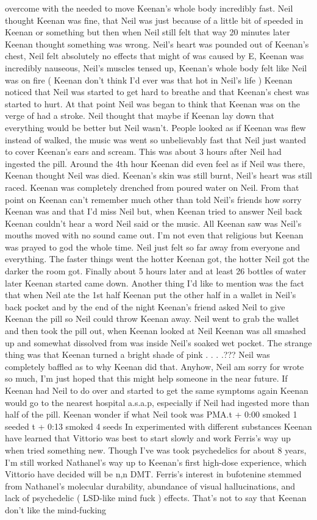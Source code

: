\documentclass[12pt]{book}
\begin{document}
overcome with the needed to move Keenan's whole body incredibly fast. Neil thought Keenan was fine, that Neil was just because of a little bit of speeded in Keenan or something but then when Neil still felt that way 20 minutes later Keenan thought something was wrong. Neil's heart was pounded out of Keenan's chest, Neil felt absolutely no effects that might of was caused by E, Keenan was incredibly nauseous, Neil's muscles tensed up, Keenan's whole body felt like Neil was on fire ( Keenan don't think I'd ever was that hot in Neil's life ) Keenan noticed that Neil was started to get hard to breathe and that Keenan's chest was started to hurt. At that point Neil was began to think that Keenan was on the verge of had a stroke. Neil thought that maybe if Keenan lay down that everything would be better but Neil wasn't. People looked as if Keenan was flew instead of walked, the music was went so unbelievably fast that Neil just wanted to cover Keenan's ears and scream. This was about 3 hours after Neil had ingested the pill. Around the 4th hour Keenan did even feel as if Neil was there, Keenan thought Neil was died. Keenan's skin was still burnt, Neil's heart was still raced. Keenan was completely drenched from poured water on Neil. From that point on Keenan can't remember much other than told Neil's friends how sorry Keenan was and that I'd miss Neil but, when Keenan tried to answer Neil back Keenan couldn't hear a word Neil said or the music. All Keenan saw was Neil's mouths moved with no sound came out. I'm not even that religious but Keenan was prayed to god the whole time. Neil just felt so far away from everyone and everything. The faster things went the hotter Keenan got, the hotter Neil got the darker the room got. Finally about 5 hours later and at least 26 bottles of water later Keenan started came down. Another thing I'd like to mention was the fact that when Neil ate the 1st half Keenan put the other half in a wallet in Neil's back pocket and by the end of the night Keenan's friend asked Neil to give Keenan the pill so Neil could throw Keenan away. Neil went to grab the wallet and then took the pill out, when Keenan looked at Neil Keenan was all smashed up and somewhat dissolved from was inside Neil's soaked wet pocket. The strange thing was that Keenan turned a bright shade of pink . . .  .??? Neil was completely baffled as to why Keenan did that. Anyhow, Neil am sorry for wrote so much, I'm just hoped that this might help someone in the near future. If Keenan had Neil to do over and started to get the same symptoms again Keenan would go to the nearest hospital a.s.a.p, especially if Neil had ingested more than half of the pill. Keenan wonder if what Neil took was PMA.t + 0:00 smoked 1 seeded t + 0:13 smoked 4 seeds In experimented with different substances Keenan have learned that Vittorio was best to start slowly and work Ferris's way up when tried something new. Though I've was took psychedelics for about 8 years, I'm still worked Nathanel's way up to Keenan's first high-dose experience, which Vittorio have decided will be n,n DMT. Ferris's interest in bufotenine stemmed from Nathanel's molecular durability, abundance of visual hallucinations, and lack of psychedelic ( LSD-like mind fuck ) effects. That's not to say that Keenan don't like the mind-fucking 
\end{document}
